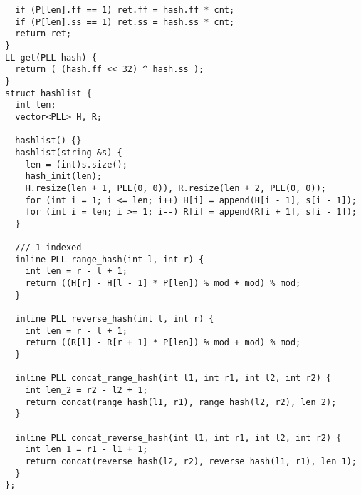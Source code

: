 \documentclass[FSZ,a4paper,onesided]{article}
\begin{document}
\begin{multicols*}{\COLS}
\begin{lstlisting}
  if (P[len].ff == 1) ret.ff = hash.ff * cnt;
  if (P[len].ss == 1) ret.ss = hash.ss * cnt;
  return ret;
}
LL get(PLL hash) {
  return ( (hash.ff << 32) ^ hash.ss );
}
struct hashlist {
  int len;
  vector<PLL> H, R;

  hashlist() {}
  hashlist(string &s) {
    len = (int)s.size();
    hash_init(len);
    H.resize(len + 1, PLL(0, 0)), R.resize(len + 2, PLL(0, 0));
    for (int i = 1; i <= len; i++) H[i] = append(H[i - 1], s[i - 1]);
    for (int i = len; i >= 1; i--) R[i] = append(R[i + 1], s[i - 1]);
  }
  
  /// 1-indexed
  inline PLL range_hash(int l, int r) {
    int len = r - l + 1;
    return ((H[r] - H[l - 1] * P[len]) % mod + mod) % mod;
  }

  inline PLL reverse_hash(int l, int r) {
    int len = r - l + 1;
    return ((R[l] - R[r + 1] * P[len]) % mod + mod) % mod;
  }

  inline PLL concat_range_hash(int l1, int r1, int l2, int r2) {
    int len_2 = r2 - l2 + 1;
    return concat(range_hash(l1, r1), range_hash(l2, r2), len_2);
  }

  inline PLL concat_reverse_hash(int l1, int r1, int l2, int r2) {
    int len_1 = r1 - l1 + 1;
    return concat(reverse_hash(l2, r2), reverse_hash(l1, r1), len_1);
  }
};\end{lstlisting}
\end{multicols*}
\end{document}
